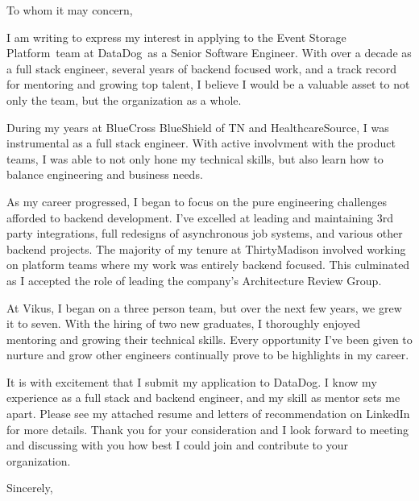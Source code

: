 
\usepackage{parskip}

\newcommand{\applyteam}{Event Storage Platform}
\newcommand{\applycompany}{DataDog}
\newcommand{\applyrole}{Senior Software Engineer}





To whom it may concern,

I am writing to express my interest in applying to the \applyteam\ team at \applycompany\ as a \applyrole.
With over a decade as a full stack engineer, several years of backend focused work, and a track record for
mentoring and growing top talent, I believe I would be a valuable asset to not only the team, but the
organization as a whole.

During my years at BlueCross BlueShield of TN and HealthcareSource, I was instrumental as a full stack
engineer. With active involvment with the product teams, I was able to not only hone my technical skills,
but also learn how to balance engineering and business needs.

As my career progressed, I began to focus on the pure engineering challenges afforded to backend development.
I've excelled at leading and maintaining 3rd party integrations, full redesigns of asynchronous job systems,
and various other backend projects. The majority of my tenure at ThirtyMadison involved working on platform
teams where my work was entirely backend focused. This culminated as I accepted the role of leading the
company's Architecture Review Group.

At Vikus, I began on a three person team, but over the next few years, we grew it to seven. With the hiring 
of two new graduates, I thoroughly enjoyed mentoring and growing their technical skills. Every opportunity
I've been given to nurture and grow other engineers continually prove to be highlights in my career.

It is with excitement that I submit my application to \applycompany. I know my experience as a
full stack and backend engineer, and my skill as mentor sets me apart. Please see my attached resume and
letters of recommendation on LinkedIn for more details. Thank you for your consideration and I look forward
to meeting and discussing with you how best I could join and contribute to your organization.

\hfill \break
Sincerely,\\
\name

